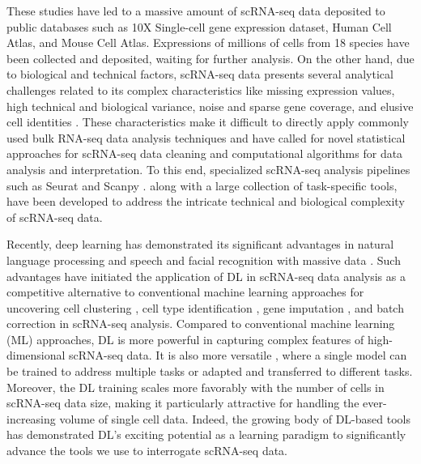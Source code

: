 \documentclass[
]{book}
\begin{document}
These studies have led to a massive amount of scRNA-seq data deposited to public databases such as 10X Single-cell gene expression dataset, Human Cell Atlas, and Mouse Cell Atlas. Expressions of millions of cells from 18 species have been collected and deposited, waiting for further analysis. On the other hand, due to biological and technical factors, scRNA-seq data presents several analytical challenges related to its complex characteristics like missing expression values, high technical and biological variance, noise and sparse gene coverage, and elusive cell identities \citep{RN87} . These characteristics make it difficult to directly apply commonly used bulk RNA-seq data analysis techniques and have called for novel statistical approaches for scRNA-seq data cleaning and computational algorithms for data analysis and interpretation. To this end, specialized scRNA-seq analysis pipelines such as Seurat \citep{RN96} and Scanpy \citep{RN100}. along with a large collection of task-specific tools, have been developed to address the intricate technical and biological complexity of scRNA-seq data.

Recently, deep learning has demonstrated its significant advantages in natural language processing and speech and facial recognition with massive data \citep{RN95, RN76, RN88}. Such advantages have initiated the application of DL in scRNA-seq data analysis as a competitive alternative to conventional machine learning approaches for uncovering cell clustering \citep{RN76, RN53} , cell type identification \citep{RN76, RN102}, gene imputation \citep{RN46, RN44, RN93} , and batch correction \citep{RN75} in scRNA-seq analysis. Compared to conventional machine learning (ML) approaches, DL is more powerful in capturing complex features of high-dimensional scRNA-seq data. It is also more versatile , where a single model can be trained to address multiple tasks or adapted and transferred to different tasks. Moreover, the DL training scales more favorably with the number of cells in scRNA-seq data size, making it particularly attractive for handling the ever-increasing volume of single cell data. Indeed, the growing body of DL-based tools has demonstrated DL's exciting potential as a learning paradigm to significantly advance the tools we use to interrogate scRNA-seq data.
\end{document}
